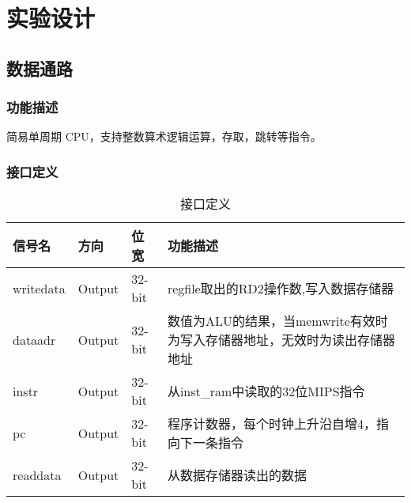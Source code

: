 \section{实验设计}

\subsection{数据通路}\label{sub:datapath}
\subsubsection{功能描述}
简易单周期 CPU，支持整数算术逻辑运算，存取，跳转等指令。

\subsubsection{接口定义}

\begin{table}[htp]
\caption{接口定义}\label{tab:signaldef}
\begin{center}
	\begin{tabular}{lllp{6cm}} \hline
	\textbf{信号名} & \textbf{方向} & \textbf{位宽} & \textbf{功能描述}\\ \hline
	writedata		& Output & 32-bit & regfile取出的RD2操作数,写入数据存储器\\ 
	dataadr         & Output & 32-bit & 数值为ALU的结果，当memwrite有效时为写入存储器地址，无效时为读出存储器地址\\
	instr           & Output & 32-bit & 从inst\_ram中读取的32位MIPS指令\\
	pc              & Output & 32-bit & 程序计数器，每个时钟上升沿自增4，指向下一条指令\\
	readdata        & Output & 32-bit & 从数据存储器读出的数据 \\ \hline
	\end{tabular}
\end{center}
\end{table}

